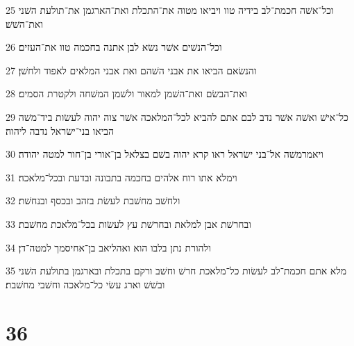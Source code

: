 \par 25 וכל־אשׁה חכמת־לב בידיה טוו ויביאו מטוה את־התכלת ואת־הארגמן את־תולעת השׁני ואת־השׁשׁ׃
\par 26 וכל־הנשׁים אשׁר נשׂא לבן אתנה בחכמה טוו את־העזים׃
\par 27 והנשׂאם הביאו את אבני השׁהם ואת אבני המלאים לאפוד ולחשׁן׃
\par 28 ואת־הבשׂם ואת־השׁמן למאור ולשׁמן המשׁחה ולקטרת הסמים׃
\par 29 כל־אישׁ ואשׁה אשׁר נדב לבם אתם להביא לכל־המלאכה אשׁר צוה יהוה לעשׂות ביד־משׁה הביאו בני־ישׂראל נדבה ליהוה׃
\par 30 ויאמרמשׁה אל־בני ישׂראל ראו קרא יהוה בשׁם בצלאל בן־אורי בן־חור למטה יהודה׃
\par 31 וימלא אתו רוח אלהים בחכמה בתבונה ובדעת ובכל־מלאכה׃
\par 32 ולחשׁב מחשׁבת לעשׂת בזהב ובכסף ובנחשׁת׃
\par 33 ובחרשׁת אבן למלאת ובחרשׁת עץ לעשׂות בכל־מלאכת מחשׁבת׃
\par 34 ולהורת נתן בלבו הוא ואהליאב בן־אחיסמך למטה־דן׃
\par 35 מלא אתם חכמת־לב לעשׂות כל־מלאכת חרשׁ וחשׁב ורקם בתכלת ובארגמן בתולעת השׁני ובשׁשׁ וארג עשׂי כל־מלאכה וחשׁבי מחשׁבת׃

\chapter{36}

